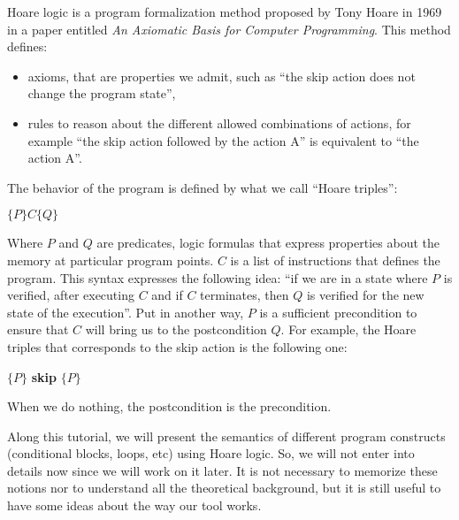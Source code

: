 \documentclass[middle]{zmdocument}
\begin{document}





Hoare logic is a program formalization method proposed by Tony Hoare in
1969 in a paper entitled \emph{An Axiomatic Basis for Computer
Programming}. This method defines:



\begin{itemize}
\item   axioms, that are properties we admit, such as ``the skip action does
  not change the program state'',
\item   rules to reason about the different allowed combinations of actions,
  for example ``the skip action followed by the action A'' is equivalent
  to ``the action A''.
\end{itemize}


The behavior of the program is defined by what we call ``Hoare
triples'':




\begin{center}
$\{P\} C \{Q\}$


\end{center}


Where $P$ and $Q$ are predicates, logic formulas that express
properties about the memory at particular program points. $C$ is a
list of instructions that defines the program. This syntax expresses the
following idea: ``if we are in a state where $P$ is verified, after
executing $C$ and if $C$ terminates, then $Q$ is verified for the
new state of the execution''. Put in another way, $P$ is a sufficient
precondition to ensure that $C$ will bring us to the postcondition
$Q$. For example, the Hoare triples that corresponds to the skip
action is the following one:




\begin{center}
$\{P\}$ \textbf{skip} $\{P\}$


\end{center}


When we do nothing, the postcondition is the precondition.



Along this tutorial, we will present the semantics of different program
constructs (conditional blocks, loops, etc) using Hoare logic. So, we
will not enter into details now since we will work on it later. It is
not necessary to memorize these notions nor to understand all the
theoretical background, but it is still useful to have some ideas about
the way our tool works.
\end{document}
